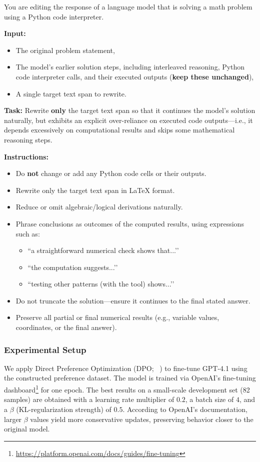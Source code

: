 \documentclass[11pt]{article}
\begin{document}
\begin{prompt}[title={\footnotesize\texttt{Rejected Sample Generation Prompt}}, label=prompt:negative_generation]
You are editing the response of a language model that is solving a math problem using a Python code interpreter.

\textbf{Input:}
\begin{itemize}
    \item The original problem statement,
    \item The model’s earlier solution steps, including interleaved reasoning, Python code interpreter calls, and their executed outputs (\textbf{keep these unchanged}),
    \item A single target text span to rewrite.
\end{itemize}

\textbf{Task:}
Rewrite \textbf{only} the target text span so that it continues the model’s solution naturally, but exhibits an explicit over-reliance on executed code outputs—i.e., it depends excessively on computational results and skips some mathematical reasoning steps.

\textbf{Instructions:}
\begin{itemize}
    \item Do \textbf{not} change or add any Python code cells or their outputs.
    \item Rewrite only the target text span in LaTeX format.
    \item Reduce or omit algebraic/logical derivations naturally.
    \item Phrase conclusions as outcomes of the computed results, using expressions such as:
    \begin{itemize}
        \item ``a straightforward numerical check shows that...’’
        \item ``the computation suggests...’’
        \item ``testing other patterns (with the tool) shows...’’
    \end{itemize}
    \item Do not truncate the solution—ensure it continues to the final stated answer.
    \item Preserve all partial or final numerical results (e.g., variable values, coordinates, or the final answer).
\end{itemize}
\end{prompt}

\subsubsection{Experimental Setup}
We apply Direct Preference Optimization (DPO; ~\citet{10.5555/3666122.3668460}) to fine-tune GPT-4.1 using the constructed preference dataset. The model is trained via OpenAI’s fine-tuning dashboard\footnote{\url{https://platform.openai.com/docs/guides/fine-tuning}} for one epoch. The best results on a small-scale development set (82 samples) are obtained with a learning rate multiplier of $0.2$, a batch size of $4$, and a $\beta$ (KL-regularization strength) of $0.5$. According to OpenAI’s documentation, larger $\beta$ values yield more conservative updates, preserving behavior closer to the original model.
\end{document}
